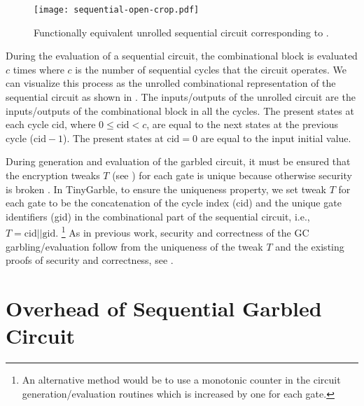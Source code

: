 \begin{figure}[ht]
    \centering
	\texttt{[image: sequential-open-crop.pdf]}
	\caption{Functionally equivalent unrolled sequential circuit corresponding to .}
	\label{fig:open-sequential}
\end{figure}

During the evaluation of a sequential circuit, the combinational block is evaluated $c$ times where $c$ is the number of sequential cycles that the circuit operates.
We can visualize this process as the unrolled combinational representation of the sequential circuit as shown in .
The inputs/outputs of the unrolled circuit are the inputs/outputs of the combinational block in all the cycles.
The present states at each cycle $\textrm{cid}$, where $0 \le \textrm{cid} < c$, are equal to the next states at the previous cycle ($\textrm{cid}-1$).
The present states at $\textrm{cid}=0$ are equal to the input initial value.

During generation and evaluation of the garbled circuit, it must be ensured that the encryption tweaks $T$ (see ) for each gate is unique because otherwise security is broken \cite[Sect. 3.4]{henecka2013faster}.
In TinyGarble, to ensure the uniqueness property, we set tweak $T$ for each gate to be the concatenation of the cycle index (cid) and the unique gate identifiers (gid) in the combinational part of the sequential circuit, i.e., $T = \textrm{cid} || \textrm{gid}$.
\footnote{An alternative method would be to use a monotonic counter in the circuit generation/evaluation routines which is increased by one for each gate.}
As in previous work, security and correctness of the GC garbling/evaluation follow from the uniqueness of the tweak $T$ and the existing proofs of security and correctness, see \cite{lindell2009proof,bellare2013efficient}.

\section{Overhead of Sequential Garbled Circuit}
